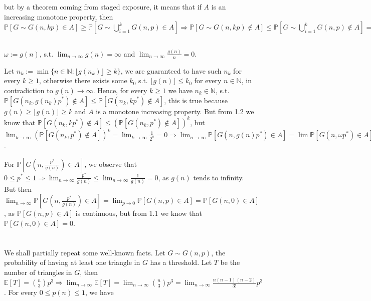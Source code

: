 \documentclass{article}
\begin{document}
but by a theorem coming from staged exposure, it means that if $A$ is an increasing monotone property, then $\mathbb{P}[G\sim{G(n,kp)}\in{A}]\geq{\mathbb{P}[G\sim\bigcup_{i=1}^{k}G(n,p)\in{A}]}\Rightarrow{\mathbb{P}[G\sim{G(n,kp)}\notin{A}]\leq{\mathbb{P}[G\sim\bigcup_{i=1}^{k}G(n,p)\notin{A}]}=(\mathbb{P}[G\sim{G(n,p)}\notin{A}]})^k$

\subsection{}
$\omega:=g(n)$, s.t. $\lim_{n\rightarrow\infty}g(n)=\infty$ and $\lim_{n\rightarrow\infty}\frac{g(n)}{n}=0$.

Let $n_k:=\min\{n\in\mathbb{N} : \lfloor{g(n_k)}\rfloor\geq{k}\}$, we are guaranteed to have such $n_k$ for every $k\geq{1}$, otherwise there exists some $k_0$ s.t. $\lfloor{g(n)}\rfloor\leq{k_0}$ for every $n\in\mathbb{N}$, in contradiction to $g(n)\rightarrow\infty$. 
Hence, for every $k\geq{1}$ we have $n_k\in\mathbb{N}$, s.t. $\mathbb{P}[G(n_k,g(n_k)p^{\ast})\notin{A}]\leq{\mathbb{P}[G(n_k,kp^{\ast})\notin{A}]}$, this is true because $g(n)\geq\lfloor{g(n)}\rfloor\geq{k}$ and $A$ is a monotone increasing property. But from 1.2 we know that $\mathbb{P}[G(n_k,kp^{\ast})\notin{A}]\leq{(\mathbb{P}[G(n_k,p^{\ast})\notin{A}])^k}$, but $\lim_{k\rightarrow\infty}(\mathbb{P}[G(n_k,p^{\ast})\notin{A}])^k=\lim_{k\rightarrow\infty}\frac{1}{2^k}=0\Rightarrow{\lim_{n\rightarrow\infty}\mathbb{P}[G(n,g(n){p^{\ast}})\in{A}]}=\lim\mathbb{P}[G(n,\omega{p^{\ast}})\in{A}]=1$.

For $\mathbb{P}[G(n,\frac{p^{\ast}}{g(n)})\in{A}]$, we observe that $0\leq{p^{\ast}}\leq{1}\Rightarrow{\lim_{n\rightarrow\infty}\frac{p^{\ast}}{g(n)}}\leq{\lim_{n\rightarrow\infty}\frac{1}{g(n)}}=0$, as $g(n)$ tends to infinity.
But then $\lim_{n\rightarrow\infty}\mathbb{P}[G(n,\frac{p^{\ast}}{g(n)})\in{A}]=\lim_{p\rightarrow{0}}\mathbb{P}[G(n,p)\in{A}]=\mathbb{P}[G(n,0)\in{A}]$, as $\mathbb{P}[G(n,p)\in{A}]$ is continuous, but from 1.1 we know that $\mathbb{P}[G(n,0)\in{A}]=0$.

\section{}
We shall partially repeat some well-known facts. Let $G\sim{G(n,p)}$, the probability of having at least one triangle in $G$ has a threshold. Let $T$ be the number of triangles in $G$, then $\mathbb{E}[T]=\binom{n}{3}p^3\Rightarrow{\lim_{n\rightarrow\infty}}\mathbb{E}[T]=\lim_{n\rightarrow\infty}\binom{n}{3}p^3=\lim_{n\rightarrow\infty}\frac{n(n-1)(n-2)}{3!}p^3$. For every $0\leq{p(n)}\leq{1}$, we have 
\end{document}
